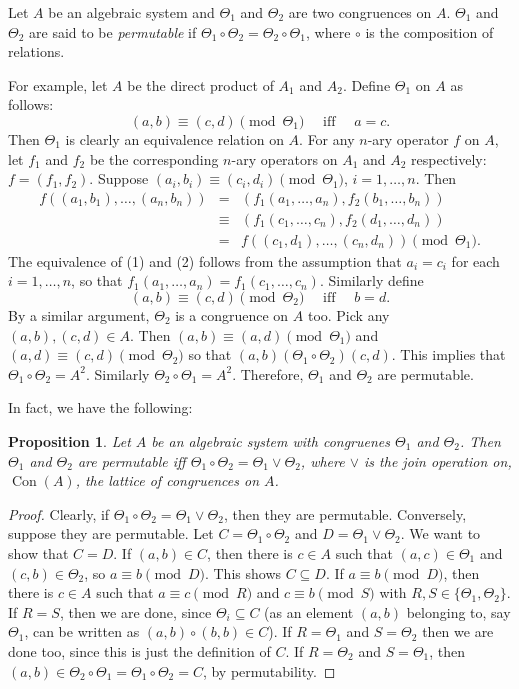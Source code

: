 \documentclass[12pt]{article}
\newtheorem{prop}{Proposition}
\begin{document}

Let $A$ be an algebraic system and $\Theta_1$ and $\Theta_2$ are two congruences on $A$.  $\Theta_1$ and $\Theta_2$ are said to be \emph{permutable} if $\Theta_1\circ \Theta_2=\Theta_2\circ\Theta_1$, where $\circ$ is the composition of relations.

For example, let $A$ be the direct product of $A_1$ and $A_2$.  Define $\Theta_1$ on $A$ as follows: 
$$(a,b)\equiv (c,d)\pmod {\Theta_1}\quad \mbox{ iff }\quad a=c.$$  
Then $\Theta_1$ is clearly an equivalence relation on $A$.  For any $n$-ary operator $f$ on $A$, let $f_1$ and $f_2$ be the corresponding $n$-ary operators on $A_1$ and $A_2$ respectively: $f=(f_1,f_2)$.  Suppose $(a_i,b_i)\equiv (c_i,d_i)\pmod{\Theta_1}$, $i=1,\ldots,n$.  Then 
\begin{eqnarray}
f((a_1,b_1),\ldots,(a_n,b_n))&=& (f_1(a_1,\ldots, a_n),f_2(b_1,\ldots,b_n)) \\ &\equiv& (f_1(c_1,\ldots,c_n),f_2(d_1,\ldots,d_n))\\ &=& f((c_1,d_1),\ldots,(c_n,d_n)) \pmod {\Theta_1}.
\end{eqnarray}
The equivalence of (1) and (2) follows from the assumption that $a_i=c_i$ for each $i=1,\ldots,n$, so that $f_1(a_1,\ldots, a_n)=f_1(c_1,\ldots,c_n)$.  Similarly define 
$$(a,b)\equiv (c,d)\pmod {\Theta_2}\quad \mbox{ iff }\quad b=d.$$  
By a similar argument, $\Theta_2$ is a congruence on $A$ too.  Pick any $(a,b),(c,d)\in A$.  Then $(a,b)\equiv (a,d) \pmod{\Theta_1}$ and $(a,d)\equiv (c,d)\pmod {\Theta_2}$ so that $(a,b)(\Theta_1\circ \Theta_2) (c,d)$.  This implies that $\Theta_1\circ\Theta_2=A^2$.  Similarly $\Theta_2\circ\Theta_1=A^2$.  Therefore, $\Theta_1$ and $\Theta_2$ are permutable.

In fact, we have the following:
\begin{prop}  Let $A$ be an algebraic system with congruenes $\Theta_1$ and $\Theta_2$.  Then $\Theta_1$ and $\Theta_2$ are permutable iff $\Theta_1\circ\Theta_2=\Theta_1\vee\Theta_2$, where $\vee$ is the join operation on, $\operatorname{Con}(A)$, the lattice of congruences on $A$.
\end{prop}
\begin{proof}
Clearly, if $\Theta_1\circ\Theta_2=\Theta_1\vee\Theta_2$, then they are permutable.  Conversely, suppose they are permutable.  Let $C=\Theta_1\circ \Theta_2$ and $D=\Theta_1\vee \Theta_2$.  We want to show that $C=D$.  If $(a,b)\in C$, then there is $c\in A$ such that $(a,c)\in \Theta_1$ and $(c,b)\in \Theta_2$, so $a\equiv b\pmod D$.  This shows $C\subseteq D$.  If $a\equiv b\pmod D$, then there is $c\in A$ such that $a\equiv c\pmod R$ and $c\equiv b\pmod S$ with $R,S\in \lbrace \Theta_1,\Theta_2\rbrace$.  If $R=S$, then we are done, since $\Theta_i\subseteq C$ (as an element $(a,b)$ belonging to, say $\Theta_1$, can be written as $(a,b)\circ(b,b)\in C$).  If $R=\Theta_1$ and $S=\Theta_2$ then we are done too, since this is just the definition of $C$.  If $R=\Theta_2$ and $S=\Theta_1$, then $(a,b)\in \Theta_2\circ\Theta_1=\Theta_1\circ\Theta_2=C$, by permutability. 
\end{proof}
\end{document}
